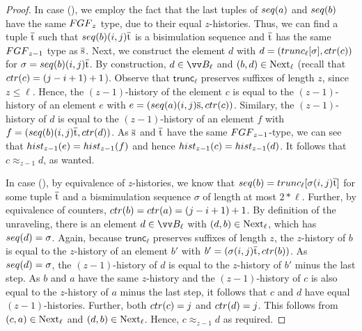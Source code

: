 \begin{proof}
  In case (), we employ the fact that the last tuples of $\seq{a}$ and $\seq{b}$ have the same $\FGF_{z}$ type, due to their equal $z$-histories.
  Thus, we can find a tuple $\overline{\mathrm{t}}$ such that $\seq{b} (i,j) \elemtuplet$ is a bisimulation sequence and $\overline{\mathrm{t}}$ has the same $\FGF_{z-1}$ type as $\overline{\mathrm{s}}$.
  Next, we construct the element $d$ with $d = (\mathsf{trunc}_{\ell}[\sigma], \ctr{c})$ for $\sigma = \seq{b}(i,j)\elemtuplet$.
  By construction, $d \in \unraveldom{B}_{\ell}$ and $(b,d) \in \mathrm{Next}_{\ell}$ (recall that $\ctr{c} = (j-i+1)+1$).
  Observe that $\mathsf{trunc}_{\ell}$ preserves suffixes of length $z$, since $z \le \ell$.
  Hence, the $(z-1)$-history of the element $c$ is equal to the $(z-1)$-history of an element $e$ with $e = (\seq{a}(i,j)\elemtuples, \ctr{c})$.
  Similary, the $(z-1)$-history of $d$ is equal to the $(z-1)$-history of an element $f$ with $f = (\seq{b}(i,j)\elemtuplet, \ctr{d})$.
  As $\overline{\mathrm{s}}$ and $\overline{\mathrm{t}}$ have the same $\FGF_{z-1}$-type, we can see that $\hist{z-1}{e} = \hist{z-1}{f}$ and hence $\hist{z-1}{c} = \hist{z-1}{d}$.
  It follows that $c \approx_{z-1} d$, as wanted.

  In case (), by equivalence of $z$-histories, we know that $\seq{b} = \mathsf{trunc}_{\ell}[\sigma(i,j)\elemtuplet]$ for some tuple $\overline{\mathrm{t}}$ and a bismimulation sequence $\sigma$ of length at most $2 * \ell$.
  Further, by equivalence of counters, $\ctr{b} = \ctr{a} = (j-i+1) + 1$.
  By definition of the unraveling, there is an element $d \in \unraveldom{B}_{\ell}$ with $(d,b) \in \mathrm{Next}_{\ell}$, which has $\seq{d} = \sigma$.
  Again, because $\mathsf{trunc}_{\ell}$ preserves suffixes of length $z$, the $z$-history of $b$ is equal to the $z$-history of an element $b'$ with $b' = (\sigma(i,j)\elemtuplet, \ctr{b})$.
  As $\seq{d} = \sigma$, the $(z-1)$-history of $d$ is equal to the $z$-history of $b'$ minus the last step.
  As $b$ and $a$ have the same $z$-history and the $(z-1)$-history of $c$ is also equal to the $z$-history of $a$ minus the last step, it follows that $c$ and $d$ have equal $(z-1)$-histories.
  Further, both $\ctr{c} = j$ and $\ctr{d} = j$.
  This follows from $(c,a) \in \mathrm{Next}_{\ell}$ and $(d,b) \in \mathrm{Next}_{\ell}$.
  Hence, $c \approx_{z-1} d$ as required.
\end{proof}

